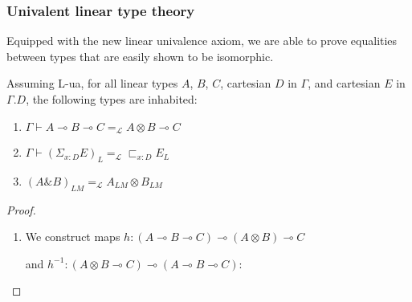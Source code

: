   \subsubsection{Univalent linear type theory}
  Equipped with the new linear univalence axiom, we are able to prove equalities between types that are easily shown to be isomorphic.
  \begin{thm}
    Assuming L-ua, for all linear types $A$, $B$, $C$, cartesian $D$ in $\Gamma$, and cartesian $E$ in $\Gamma.D$, the following types are inhabited:
    \begin{enumerate}
    \item $\Gamma \vdash A \multimap B \multimap C =_{\mathcal{L}} A \otimes B \multimap C$
    \item $\Gamma \vdash (\Sigma_{x : D}E)_L =_{\mathcal{L}}\sqsubset_{x :D}E_L$
    \item $(A \& B)_{LM} =_{\mathcal{L}} A_{LM} \otimes B_{LM}$
    \end{enumerate}
    \begin{proof}
      \begin{enumerate}
      \item We construct maps $h : (A \multimap B \multimap C) \multimap (A \otimes B) \multimap C$
        \begin{prooftree}
        \end{prooftree}
and $h^{-1} : (A \otimes B \multimap C) \multimap (A \multimap B \multimap C)$:

\end{enumerate}
\end{proof}
\end{thm}
